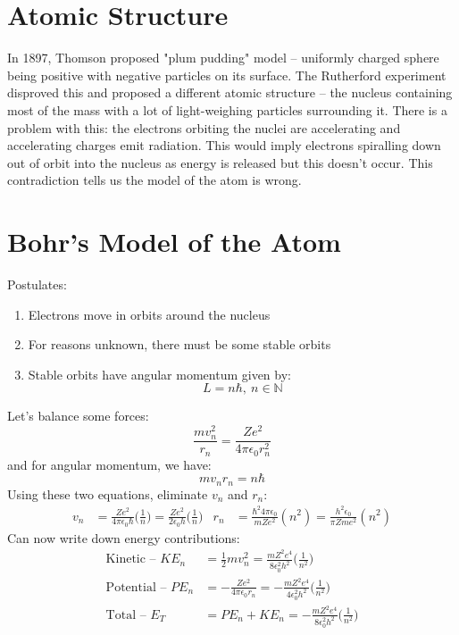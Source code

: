 \documentclass[a4paper, 11pt, normalem]{report}
\begin{document}
\section{Atomic Structure}
In 1897, Thomson proposed "plum pudding" model -- uniformly charged sphere being positive with negative particles on its surface.
The Rutherford experiment disproved this and proposed a different atomic structure -- the nucleus containing most of the mass with a lot of light-weighing particles surrounding it.
There is a problem with this: the electrons orbiting the nuclei are accelerating and accelerating charges emit radiation.
This would imply electrons spiralling down out of orbit into the nucleus as energy is released but this doesn't occur.
This contradiction tells us the model of the atom is wrong.

\section{Bohr's Model of the Atom}
Postulates:
\begin{enumerate}
    \item Electrons move in orbits around the nucleus
    \item For reasons unknown, there must be some stable orbits
    \item Stable orbits have angular momentum given by:
        \begin{equation}
            L = n\hbar,~n \in \mathbb{N}
        \end{equation}
\end{enumerate}
Let's balance some forces:
\begin{equation}
    \frac{mv_{n}^{2}}{r_{n}} = \frac{Ze^{2}}{4\pi\epsilon_{0}r_{n}^{2}}
\end{equation}
and for angular momentum, we have:
\begin{equation}
    mv_{n}r_{n} = n\hbar
\end{equation}
Using these two equations, eliminate $v_{n}$ and $r_{n}$:
\begin{align}
    v_{n} &= \frac{Ze^{2}}{4\pi\epsilon_{0}\hbar}\Big(\frac{1}{n}\Big) = \frac{Ze^{2}}{2\epsilon_{0}h}\Big(\frac{1}{n}\Big) & r_{n} &= \frac{\hbar^{2}4\pi\epsilon_{0}}{mZe^{2}}(n^{2}) = \frac{h^{2}\epsilon_{0}}{\pi Zme^{2}}(n^{2})
\end{align}
Can now write down energy contributions:
\begin{align}
    \text{Kinetic -- }KE_{n} &= \frac{1}{2}mv_{n}^{2} = \frac{mZ^{2}e^{4}}{8\epsilon_{0}^{2}h^{2}}\Big(\frac{1}{n^{2}}\Big) \\
    \text{Potential -- }PE_{n} &= -\frac{Ze^{2}}{4\pi\epsilon_{0}r_{n}} = -\frac{mZ^{2}e^{4}}{4\epsilon_{0}^{2}h^{2}}\Big(\frac{1}{n^{2}}\Big) \\
    \text{Total -- }E_{T} &= PE_{n} + KE_{n} = -\frac{mZ^{2}e^{4}}{8\epsilon_{0}^{2}h^{2}}\Big(\frac{1}{n^{2}}\Big)
\end{align}
\end{document}
